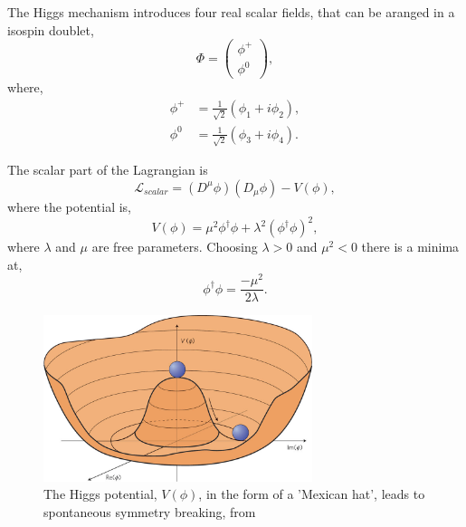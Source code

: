 The Higgs mechanism introduces four real scalar fields, that can be aranged in a
isospin doublet,
\begin{equation}
\Phi = \left( \begin{matrix} \phi^{+} \\ \phi^{0} \end{matrix} \right),
\end{equation}
where,
\begin{align*}
\phi^{+} &=\frac{1}{\sqrt{2}} (\phi_{1} + i \phi_{2}),\\
\phi^{0} &=\frac{1}{\sqrt{2}} (\phi_{3} + i \phi_{4}).
\end{align*}

The scalar part of the Lagrangian is
\begin{equation}
\mathcal{L}_{scalar} = 
\left(D^{\mu}\phi\right) \left(D_{\mu}\phi\right) - V(\phi),
\end{equation}
where the potential is,
\begin{equation}
V(\phi) = 
\mu^{2}\phi^{\dagger}\phi + 
\lambda^{2} \left( \phi^{\dagger} \phi \right)^{2},
\end{equation}
where $\lambda$ and $\mu$ are free parameters. Choosing  $\lambda>0$ and
$\mu^{2}<0$ there is a minima at,
\begin{equation}
\phi^{\dagger} \phi = \frac{- \mu^{2}}{2 \lambda}.
\end{equation}

\begin{figure}[htb]
  \centering
  \includegraphics[width=0.7\textwidth]{nphys1874-f1.jpg}
  \caption{ The Higgs potential, $V(\phi)$, in the form of a 'Mexican hat',
leads to spontaneous symmetry breaking, from \cite{}}
  \label{fig:higgspot}
\end{figure}

